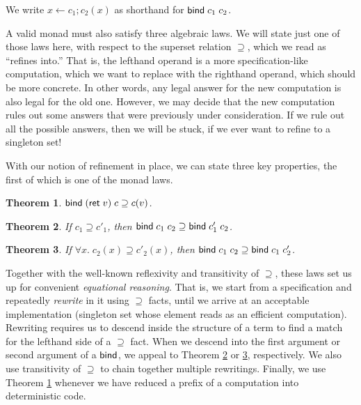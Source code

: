 \documentclass{amsbook}
\newtheorem{theorem}{Theorem}[chapter]
\theoremstyle{definition}
\theoremstyle{remark}
\numberwithin{section}{chapter}
\numberwithin{equation}{chapter}
\begin{document}
We write $x \leftarrow c_1; c_2(x)$ as shorthand for $\mathsf{bind} \; c_1 \; c_2$.

A valid monad must also satisfy three algebraic laws.
We will state just one of those laws here, with respect to the superset relation $\supseteq$, which we read as ``refines into.''
That is, the lefthand operand is a more specification-like computation, which we want to replace with the righthand operand, which should be more concrete.
In other words, any legal answer for the new computation is also legal for the old one.
However, we may decide that the new computation rules out some answers that were previously under consideration.
If we rule out all the possible answers, then we will be stuck, if we ever want to refine to a singleton set!

With our notion of refinement in place, we can state three key properties, the first of which is one of the monad laws.

\begin{theorem}\label{bindret}
  $\mathsf{bind} \; (\mathsf{ret} \; v) \; c \supseteq c(v)$.
\end{theorem}

\begin{theorem}\label{refine1}
  If $c_1 \supseteq c'_1$, then $\mathsf{bind} \; c_1 \; c_2 \supseteq \mathsf{bind} \; c'_1 \; c_2$.
\end{theorem}

\begin{theorem}\label{refine2}
  If $\forall x. \; c_2(x) \supseteq c'_2(x)$, then $\mathsf{bind} \; c_1 \; c_2 \supseteq \mathsf{bind} \; c_1 \; c'_2$.
\end{theorem}

Together with the well-known reflexivity and transitivity of $\supseteq$, these laws set us up for convenient \emph{equational reasoning}.
That is, we start from a specification and repeatedly \emph{rewrite} in it using $\supseteq$ facts, until we arrive at an acceptable implementation (singleton set whose element reads as an efficient computation).
Rewriting requires us to descend inside the structure of a term to find a match for the lefthand side of a $\supseteq$ fact.
When we descend into the first argument or second argument of a $\mathsf{bind}$, we appeal to Theorem \ref{refine1} or \ref{refine2}, respectively.
We also use transitivity of $\supseteq$ to chain together multiple rewritings.
Finally, we use Theorem \ref{bindret} whenever we have reduced a prefix of a computation into deterministic code.
\end{document}
